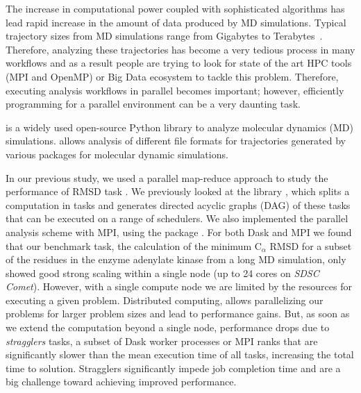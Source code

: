 \label{sec:introduction}
The increase in computational power coupled with sophisticated algorithms has lead rapid increase in the amount of data produced by MD simulations. 
Typical trajectory sizes from MD simulations range from Gigabytes to Terabytes~\cite{Cheatham:2015}.
Therefore, analyzing these trajectories has become a very tedious process in many workflows and as a result people are trying to look for state of the art HPC tools (MPI and OpenMP) or Big Data ecosystem to tackle this problem.
Therefore, executing analysis workflows in parallel becomes important; however, efficiently programming for a parallel environment can be a very daunting task. 

 \citep{Gowers:2016aa,Michaud-Agrawal:2011fu} is a widely used open-source Python library to analyze molecular dynamics (MD) simulations. 
 allows analysis of different file formats for trajectories generated by various packages for molecular dynamic simulations. 

In our previous study, we used a parallel map-reduce approach to study the performance of RMSD task \cite{Khoshlessan:2017ab}. 
We previously looked at the  library \cite{Rocklin:2015aa}, which splits a computation in tasks and generates directed acyclic graphs (DAG) of these tasks that can be executed on a range of schedulers. 
We also implemented the parallel analysis scheme with MPI, using the  package \cite{Dalcin:2011aa, Dalcin:2005aa}. 
For both Dask and MPI we found that our benchmark task, the calculation of the minimum C$_{\alpha}$ RMSD for a
subset of the residues in the enzyme adenylate kinase from a long MD simulation, only showed good strong scaling within a single node (up to 24 cores on \emph{SDSC Comet}).
However, with a single compute node we are limited by the resources for executing a given problem.
Distributed computing, allows parallelizing our problems for larger problem sizes and lead to performance gains.
But, as soon as we extend the computation beyond a single node, performance drops due to \emph{stragglers} tasks, a subset of Dask worker processes or MPI ranks that are significantly slower than the mean execution time of all tasks, increasing the total time to solution.
Stragglers significantly impede job completion time and are a big challenge toward achieving improved performance.

